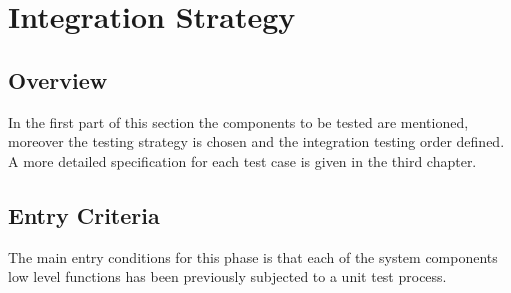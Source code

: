 \documentclass[11pt,titlepage]{article} %
\begin{document}
\newpage

\section{Integration Strategy}

\subsection{Overview}
  In the first part of this section the components to be tested are mentioned,
  moreover the testing strategy is chosen and the integration testing order defined.\newline
  A more detailed specification for each test case is given in the third chapter.

\subsection{Entry Criteria}
  The main entry conditions for this phase is that each of the system components low level functions
  has been previously subjected to a unit test process. 
\end{document}
